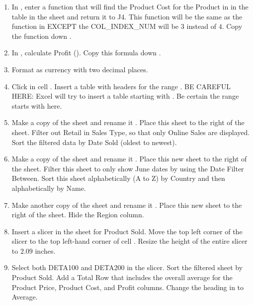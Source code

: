 \begin{enumerate}[resume]
	\item In  , enter a  function that will find the Product Cost for the Product in  in the table in the  sheet and return it to J4. This  function will be the same as the  function in  EXCEPT the COL\_INDEX\_NUM will be $ 3 $ instead of $ 4 $. Copy the function down .
	\item In , calculate Profit (). Copy this formula down .
	\item Format  as currency with two decimal places.
	\item Click in cell . Insert a table with headers for the range . BE CAREFUL HERE: Excel will try to insert a table starting with . Be certain the range starts with  here.
	\item Make a copy of the  sheet and rename it . Place this sheet to the right of the  sheet. Filter out Retail in Sales Type, so that only Online Sales are displayed. Sort the filtered data by Date Sold (oldest to newest).
	\item Make a copy of the  sheet and rename it . Place this new sheet to the right of the  sheet. Filter this sheet to only show June dates by using the Date Filter Between. Sort this sheet alphabetically (A to Z) by Country and then alphabetically by Name.
	\item Make another copy of the  sheet and rename it . Place this new sheet to the right of the  sheet. Hide the Region column.
	\item Insert a slicer in the  sheet for Product Sold. Move the top left corner of the slicer to the top left-hand corner of cell . Resize the height of the entire slicer to $ 2.09 $ inches.
	\item Select both DETA100 and DETA200 in the slicer. Sort the filtered sheet by Product Sold. Add a Total Row that includes the overall average for the Product Price, Product Cost, and Profit columns. Change the heading in  to Average.

\end{enumerate}
